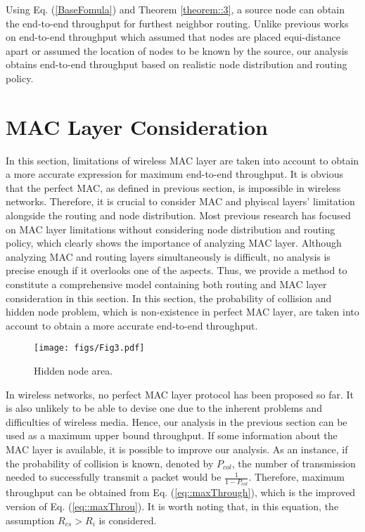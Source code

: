 \documentclass[12pt, draftclsnofoot, onecolumn]{IEEEtran}
\begin{document}
Using Eq. (\ref{BaseFomula}) and Theorem \ref{theorem::3}, 
a source node can obtain the end-to-end throughput for furthest 
neighbor routing. Unlike previous works on end-to-end 
throughput \cite{ref4,ref5,ref6,ref8,ref9,ref10,ref14,ref17,ref13} which assumed 
that nodes are placed equi-distance apart or assumed the location 
of nodes to be known by the source, our analysis obtains end-to-end 
throughput based on realistic node distribution and routing policy.

\section{MAC Layer Consideration}
\label{macLayer}

In this section, limitations of wireless MAC layer are taken into account 
to obtain a more accurate expression for maximum end-to-end throughput. It is obvious that the perfect MAC, as defined in previous section, is impossible in wireless networks. Therefore, it is crucial to consider MAC and phyiscal layers' limitation alongside the routing and node distribution.
Most previous research has focused on MAC layer limitations without considering 
node distribution and routing policy, which clearly shows the importance of analyzing MAC layer.
Although analyzing MAC and routing layers simultaneously is difficult,
no analysis is precise enough if it overlooks one of the aspects. Thus, we provide a method 
to constitute a comprehensive model containing both routing and MAC layer consideration in 
this section. In this section, the probability of collision and hidden node problem, which is non-existence in perfect MAC layer, are taken into account to obtain a more accurate end-to-end throughput.


\begin{figure}
\centering
\texttt{[image: figs/Fig3.pdf]}
\caption{Hidden node area.}
\label{figHNA}
\end{figure}


In wireless networks, no perfect MAC layer protocol has been proposed so far.
It is also unlikely to be able to devise one due to the inherent problems 
and difficulties of wireless media. Hence, our analysis in the previous section 
can be used as a maximum upper bound throughput. If some information about the MAC layer is available, it is possible to improve 
our analysis. As an instance, if the probability of collision is known, denoted by 
$P_{col}$, the number of transmission needed to successfully transmit a packet 
would be $\frac{1}{1-P_{col}}$. Therefore, maximum throughput can be obtained 
from Eq. (\ref{eq::maxThrough}), which is the improved version of Eq. (\ref{eq::maxThrou}). It is worth noting that, in this equation, the
assumption $R_{cs}>R_i$ is considered.
\end{document}
